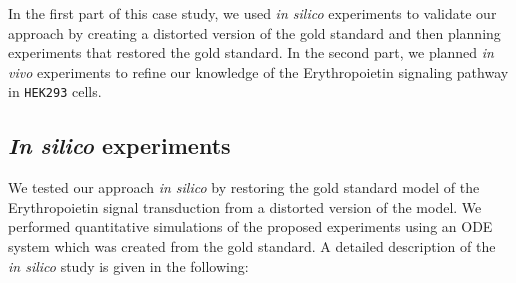 In the first part of this case study,
we used \emph{in silico} experiments to validate our approach by creating a
distorted version of the gold standard and then planning experiments that
restored the gold standard.
In the second part, we planned \emph{in vivo} experiments to refine our
knowledge of the Erythropoietin signaling pathway in \texttt{HEK293} cells.


\subsection{\emph{In silico} experiments}

We tested our approach \emph{in silico} by restoring the gold standard model
of the Erythropoietin signal transduction from a distorted version of the model.
We performed quantitative simulations of the proposed experiments using an
ODE system which was created from the gold standard.
A detailed description of the \emph{in silico} study is given in the following:

